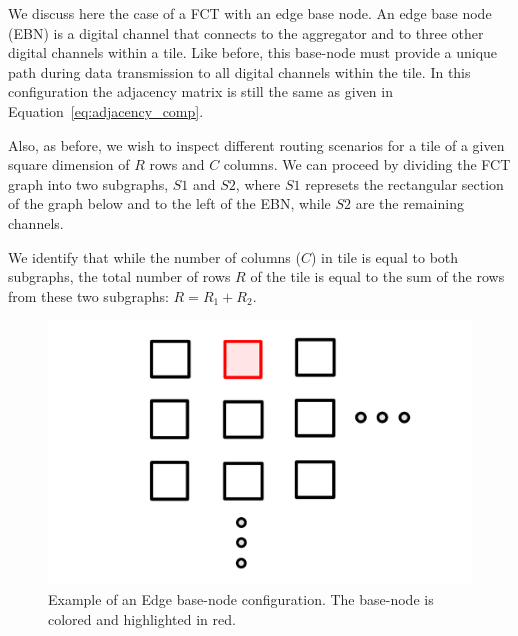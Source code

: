We discuss here the case of a FCT with an edge base node.
An edge base node (EBN) is a digital channel that connects to the aggregator and to three other digital channels within a tile.
Like before, this base-node must provide a unique path during data transmission to all digital channels within the tile.
In this configuration the adjacency matrix is still the same as given in Equation~\ref{eq:adjacency_comp}.

Also, as before, we wish to inspect different routing scenarios for a tile of a given square dimension of $R$ rows and $C$ columns.
We can proceed by dividing the FCT graph into two subgraphs, $S1$ and $S2$, where $S1$ represets the rectangular section of the graph below and to the left of the EBN, while $S2$ are the remaining channels.

We identify that while the number of columns ($C$) in tile is equal to both subgraphs, the total number of rows $R$ of the tile is equal to the sum of the rows from these two subgraphs: $R = R_{1} + R_{2}$.

\begin{figure}[]
\centering
\includegraphics[width=\textwidth]{images/EBN.pdf}
\caption{Example of an Edge base-node configuration. The base-node is colored and highlighted in red.}
\end{figure}~\label{fig:ebn}



